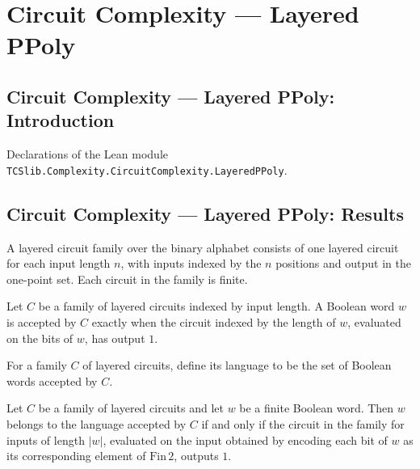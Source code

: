 \section{Circuit Complexity --- Layered PPoly}
\subsection*{Circuit Complexity --- Layered PPoly: Introduction}

Declarations of the Lean module \texttt{TCSlib.Complexity.CircuitComplexity.LayeredPPoly}.

\subsection*{Circuit Complexity --- Layered PPoly: Results}

\begin{definition}
\label{BoolCircuit.LayeredCircuitFamily}
\leanok
{}
A layered circuit family over the binary alphabet consists of one layered circuit for
each input length $n$, with inputs indexed by the $n$ positions and output in the
one-point set. Each circuit in the family is finite.
\end{definition}

\begin{definition}
\label{BoolCircuit.LayeredCircuitFamily.Accepts}
\leanok
{}
Let $C$ be a family of layered circuits indexed by input length. A Boolean word $w$ is
accepted by $C$ exactly when the circuit indexed by the length of $w$, evaluated on the
bits of $w$, has output $1$.
\end{definition}

\begin{definition}
\label{BoolCircuit.LayeredCircuitFamily.language}
\leanok
{}
For a family $C$ of layered circuits, define its language to be the set of Boolean words
accepted by $C$.
\end{definition}

\begin{theorem}
\label{BoolCircuit.LayeredCircuitFamily.mem_language_iff}
\leanok
{}
Let $C$ be a family of layered circuits and let $w$ be a finite Boolean word. Then $w$
belongs to the language accepted by $C$ if and only if the circuit in the family for
inputs of length $|w|$, evaluated on the input obtained by encoding each bit of $w$ as
its corresponding element of $\mathrm{Fin}\,2$, outputs $1$.
\end{theorem}

